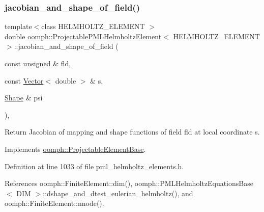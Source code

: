 \mbox{\label{classoomph_1_1ProjectablePMLHelmholtzElement_aa4af5bb878fed3d1b286bde1da0f5419}} 
\subsubsection{\texorpdfstring{jacobian\+\_\+and\+\_\+shape\+\_\+of\+\_\+field()}{jacobian\_and\_shape\_of\_field()}}
{\footnotesize\ttfamily template$<$class H\+E\+L\+M\+H\+O\+L\+T\+Z\+\_\+\+E\+L\+E\+M\+E\+NT $>$ \\
double \hyperlink{classoomph_1_1ProjectablePMLHelmholtzElement}{oomph\+::\+Projectable\+P\+M\+L\+Helmholtz\+Element}$<$ H\+E\+L\+M\+H\+O\+L\+T\+Z\+\_\+\+E\+L\+E\+M\+E\+NT $>$\+::jacobian\+\_\+and\+\_\+shape\+\_\+of\+\_\+field (\begin{DoxyParamCaption}\item[{const unsigned \&}]{fld,  }\item[{const \hyperlink{classoomph_1_1Vector}{Vector}$<$ double $>$ \&}]{s,  }\item[{\hyperlink{classoomph_1_1Shape}{Shape} \&}]{psi }\end{DoxyParamCaption})\hspace{0.3cm}{\ttfamily [inline]}, {\ttfamily [virtual]}}



Return Jacobian of mapping and shape functions of field fld at local coordinate s. 



Implements \hyperlink{classoomph_1_1ProjectableElementBase_ad45c21b58c0985d52f68ab2d79cbb488}{oomph\+::\+Projectable\+Element\+Base}.



Definition at line 1033 of file pml\+\_\+helmholtz\+\_\+elements.\+h.



References oomph\+::\+Finite\+Element\+::dim(), oomph\+::\+P\+M\+L\+Helmholtz\+Equations\+Base$<$ D\+I\+M $>$\+::dshape\+\_\+and\+\_\+dtest\+\_\+eulerian\+\_\+helmholtz(), and oomph\+::\+Finite\+Element\+::nnode().

